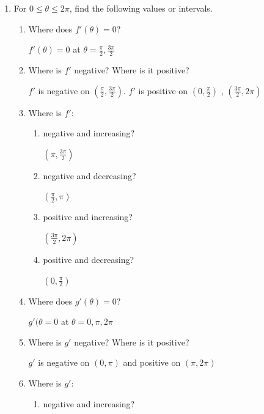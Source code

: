 \documentclass[nooutcomes]{ximera}
\begin{document}
\begin{problem}
\begin{enumerate}
	\item For $0 \leq \theta \leq 2\pi$, find the following values or intervals.
		\begin{enumerate}
			\item Where does $f'(\theta)=0$?
		\begin{freeResponse}
			$f'(\theta)=0$ at $\theta=\frac{\pi}{2},\frac{3\pi}{2}$
		\end{freeResponse}
			\item Where is $f'$ negative?  Where is it positive?
		\begin{freeResponse}
			$f'$ is negative on $\left( \frac{\pi}{2},\frac{3 \pi}{2}\right)$.  $f'$ is positive on $ \left( 0,\frac{\pi}{2} \right)$ , $ \left( \frac{3 \pi}{2},2 \pi \right)$
		\end{freeResponse}
			\item Where is $f'$:
			\begin{enumerate}
			\item negative and increasing?
				\begin{freeResponse}
					$(\pi,\frac{3\pi}{2})$
				\end{freeResponse}
			\item negative and decreasing?
				\begin{freeResponse}
					$(\frac{\pi}{2},\pi)$
				\end{freeResponse}
			\item positive and increasing?
				\begin{freeResponse}
					$(\frac{3\pi}{2},2\pi)$
				\end{freeResponse}
			\item positive and decreasing?
				\begin{freeResponse}
					$(0,\frac{\pi}{2})$
				\end{freeResponse}
			\end{enumerate}
			\item Where does $g'(\theta)=0$?
		\begin{freeResponse}
			$g'(\theta=0$ at $\theta=0,\pi,2\pi$
		\end{freeResponse}
			\item Where is $g'$ negative?  Where is it positive?
		\begin{freeResponse}
			$g'$ is negative on $(0,\pi)$ and positive on $(\pi,2\pi)$
		\end{freeResponse}
			\item Where is $g'$:
			\begin{enumerate}
			\item negative and increasing?

\end{enumerate}
\end{enumerate}
\end{enumerate}
\end{problem}
\end{document}
